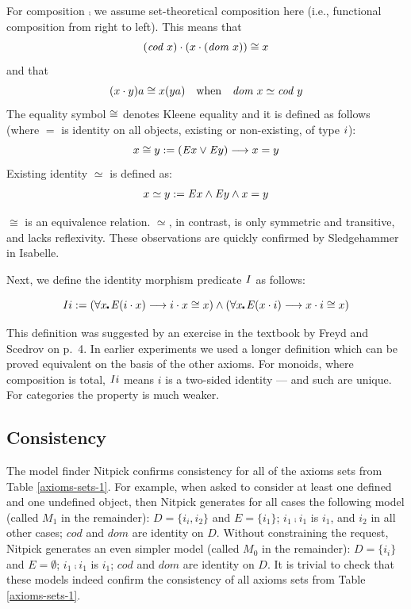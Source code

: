 For composition $\comp$ we assume set-theoretical composition here (i.e., functional 
composition from right to left). This means that
\[(\textit{cod \/} x) \cdot (x \cdot (\textit{dom \/} x)) \cong x\] 
and that 
\[(x \cdot y)a \cong x(y a) \quad \text{when}\quad
\textit{dom \/} x \simeq \textit{cod \/} y\] 
The equality symbol $\cong$ denotes Kleene equality and it
is defined as follows (where $=$ is identity on all objects, existing or non-existing, 
of type $i$):
\[x \cong y := (\mathit{E} x \vee \mathit{E} y) \longrightarrow x = y\]
Existing identity $\simeq$ is defined as:
\[x \simeq y := \mathit{E} x \wedge \mathit{E} y \wedge  x = y\]

$\cong$ is an equivalence relation. $\simeq$, in contrast, is only symmetric and transitive, and lacks 
reflexivity. These observations are quickly confirmed by Sledgehammer
in Isabelle.


Next, we define the identity morphism predicate $\textit{I\/}$ as follows: 

\[\id i \ddef (\forall x\lambdot \ex(i \comp x) \imp i \comp
x \cong x) \wedge (\forall x\lambdot \ex(x \comp i) \imp x \comp i \cong x)\]

This definition was suggested by an exercise in the textbook by Freyd
and Scedrov \cite{FreydScedrov90}
on p.~4.  In earlier experiments we used a longer definition which can
be proved equivalent on the basis of the other axioms. For monoids,
where composition is total, $\textit{I\/} i$ means $i$ is a two-sided identity
--- and such are unique. For categories the property is much weaker.
 

\subsection{Consistency}
The model finder Nitpick confirms consistency for all of the axioms
sets from Table \ref{axioms-sets-1}. For example, when asked to consider at least one defined and one undefined object, then
Nitpick generates for all cases the following model (called $M_1$ in the remainder):
$D=\{i_i,i_2\}$ and $E=\{i_1\}$;  $i_1\comp i_1$ is $i_1$,  and $i_2$
in all other cases; $cod$ and $dom$ are identity on $D$. Without constraining the request, Nitpick
generates an even simpler model (called $M_0$ in the remainder):
$D=\{i_i\}$ and $E=\emptyset$; $i_1\comp i_1$ is $i_1$; $cod$ and
$dom$ are identity on $D$. It is trivial to check that these models
indeed confirm the consistency of all axioms sets from Table \ref{axioms-sets-1}.



